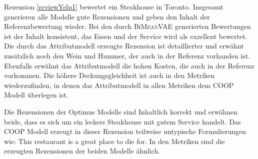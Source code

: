 Rezension \ref{reviewYelp1} bewertet ein Steakhouse in Toronto. 
Insgesamt generieren alle Modelle gute Rezensionen und geben den Inhalt der Referenzbewertung wieder. 
Bei den durch \textsc{BiMeanVAE} generierten Bewertungen ist der Inhalt konsistent, das Essen und der Service wird als exzellent bewertet.
Die durch das Attributmodell erzeugte Rezension ist detaillierter und erwähnt zusätzlich noch den Wein und Hummer, der auch in der Referenz vorhanden ist. Ebenfalls erwähnt das Attributmodell die hohen Kosten, die auch in der Referenz vorkommen.
Die höhere Deckungsgleichheit ist auch in den Metriken wiederzufinden, in denen das Attributmodell in allen Metriken dem COOP Modell überlegen ist. 

Die Rezensionen der Optimus Modelle sind Inhaltlich korrekt und erwähnen beide, dass es sich um ein leckers Steakhouse mit gutem Service handelt.
Das COOP Modell erzeugt in dieser Rezension teilweise untypische Formulierungen wie: \glqq{}This restaurant is a great place to die for\grqq{}.
In den Metriken sind die erzeugten Rezensionen der beiden Modelle ähnlich.

